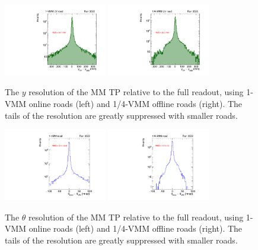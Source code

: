 \begin{figure}[!htpb]
  \begin{center}
    \includegraphics[width=0.4\textwidth]{figures/gbtanalysis3522/TP_yres_1road.pdf}
    \includegraphics[width=0.4\textwidth]{figures/gbtanalysis3522/TP_yres_smallroad.pdf}
  \end{center}
  \vspace{-10pt}
  \caption{The $y$ resolution of the MM TP relative to the full readout, using 1-VMM online roads (left) and 1/4-VMM offline roads (right). The tails of the resolution are greatly suppressed with smaller roads.}
  \label{fig:yres}
\end{figure}

\begin{figure}[!htpb]
  \begin{center}
    \includegraphics[width=0.4\textwidth]{figures/gbtanalysis3522/TP_angres_full.pdf}
    \includegraphics[width=0.4\textwidth]{figures/gbtanalysis3522/TP_angres.pdf}
  \end{center}
  \vspace{-10pt}
  \caption{The $\theta$ resolution of the MM TP relative to the full readout, using 1-VMM online roads (left) and 1/4-VMM offline roads (right). The tails of the resolution are greatly suppressed with smaller roads.}
  \label{fig:thetares}
\end{figure}


